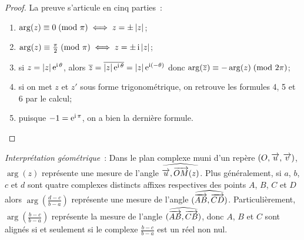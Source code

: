 \begin{proof}
    La preuve s'articule en cinq parties~:
    \begin{enumerate}
        \item \(\arg(z) \equiv 0\!\pmod {\pi} \iff z = \pm \left\lvert z\right\rvert\);
        \item \(\arg(z) \equiv \frac{\pi}{2}\!\pmod {\pi} \iff z = \pm \operatorname{i} \left\lvert z\right\rvert\);
        \item si \(z=\left\lvert z\right\rvert \operatorname{e}^{\operatorname{i} \theta}\), alors 
            \(\overline{z}=\overline{|z| \operatorname{e}^{\operatorname{i} \theta}}=|z| \operatorname{e}^{\operatorname{i} (-\theta)}\) donc 
            \(\arg(\overline{z}) \equiv -\arg(z)\!\pmod {2\pi}\);
        \item si on met \(z\) et \(z'\) sous forme trigonométrique, on retrouve les formules 4, 5 et 6 par le calcul;
        \item puisque \(-1=\operatorname{e}^{\operatorname{i} \pi}\), on a bien la dernière formule.
    \end{enumerate}
\end{proof}
\emph{Interprétation géométrique}~: Dans le plan complexe muni d'un repère 
\((O,\overrightarrow{u}, \overrightarrow{v})\), \(\arg(z)\) représente une mesure de l'angle 
\(\widehat{\overrightarrow{u}, \overrightarrow{OM}(z)}\). Plus généralement, si \(a\), \(b\), \(c\) 
et \(d\) sont quatre complexes distincts affixes respectives des points \(A\), 
\(B\), \(C\) et \(D\) alors \(\arg\left(\frac{d-c}{b-a}\right)\) représente une 
mesure de l'angle \((\widehat{\overrightarrow{AB},\overrightarrow{CD}})\). Particulièrement, 
\(\arg\left(\frac{b-c}{b-a}\right)\) représente la mesure de l'angle 
\((\widehat{\overrightarrow{AB},\overrightarrow{CB}})\), donc \(A\), \(B\) et \(C\) sont alignés si 
et seulement si le complexe \(\frac{b-c}{b-a}\) est un réel non nul.
